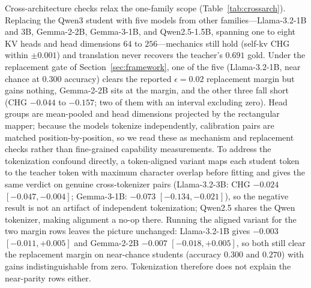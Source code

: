\documentclass[10pt]{article}
\begin{document}
Cross-architecture checks relax the one-family scope
(Table~\ref{tab:crossarch}). Replacing the Qwen3 student with five models from
other families---Llama-3.2-1B and 3B, Gemma-2-2B, Gemma-3-1B, and
Qwen2.5-1.5B, spanning one to eight KV heads and head dimensions $64$ to
$256$---mechanics still hold (self-kv CHG within $\pm0.001$) and translation
never recovers the teacher's $0.691$ gold. Under the replacement gate of
Section~\ref{sec:framework}, one of the five (Llama-3.2-1B, near chance at
$0.300$ accuracy) clears the reported $\epsilon{=}0.02$ replacement margin but gains nothing, Gemma-2-2B sits at the
margin, and the other three fall short (CHG $-0.044$ to $-0.157$; two of them
with an interval excluding zero). Head groups are mean-pooled and head
dimensions projected by the rectangular mapper; because the models tokenize
independently, calibration pairs are matched position-by-position, so we read
these as mechanism and replacement checks rather than fine-grained capability
measurements. To address the tokenization confound directly, a token-aligned
variant maps each student token to the teacher token with maximum character
overlap before fitting and gives the same verdict on genuine cross-tokenizer
pairs (Llama-3.2-3B: CHG $-0.024$ $[-0.047,-0.004]$; Gemma-3-1B: $-0.073$
$[-0.134,-0.021]$), so the negative result is not an artifact of independent
tokenization; Qwen2.5 shares the Qwen tokenizer, making alignment a no-op
there. Running the aligned variant for the two margin rows leaves the picture
unchanged: Llama-3.2-1B gives $-0.003$ $[-0.011,+0.005]$ and Gemma-2-2B
$-0.007$ $[-0.018,+0.005]$, so both still clear the replacement margin on
near-chance students (accuracy $0.300$ and $0.270$) with gains indistinguishable
from zero. Tokenization therefore does not explain the near-parity rows either.
\end{document}
